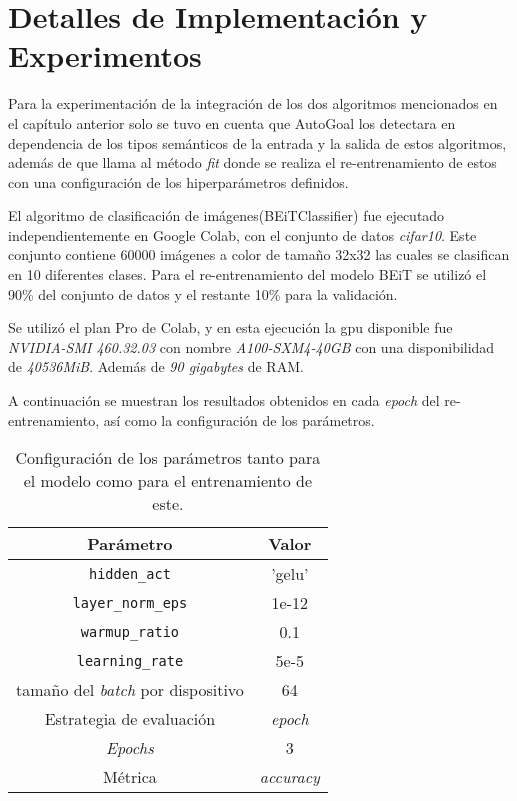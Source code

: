 \chapter{Detalles de Implementación y Experimentos}\label{chapter:implementation}
Para la experimentación de la integración de los dos algoritmos mencionados en el capítulo anterior solo se tuvo en cuenta que AutoGoal los detectara en dependencia de los tipos semánticos de la entrada y la salida de estos algoritmos, además de que llama al método \textit{fit} donde se realiza el re-entrenamiento de estos con una configuración de los hiperparámetros definidos. 

El algoritmo de clasificación de imágenes(BEiTClassifier) fue ejecutado independientemente en Google Colab, con el conjunto de datos \textit{cifar10}. Este conjunto contiene 60000 imágenes a color de tamaño 32x32 las cuales se clasifican en 10 diferentes clases. Para el re-entrenamiento del modelo BEiT se utilizó el 90\% del conjunto de datos y el restante 10\% para la validación.

Se utilizó el plan Pro de Colab, y en esta ejecución la gpu disponible fue \textit{NVIDIA-SMI 460.32.03} con nombre \textit{A100-SXM4-40GB} con una disponibilidad de \textit{40536MiB}. Además de \textit{90 gigabytes} de RAM.

A continuación se muestran los resultados obtenidos en cada \textit{epoch} del re-entrenamiento, así como la configuración de los parámetros. 

\begin{table}[h!]
  \centering
  \begin{tabular}{||c c||} 
      \hline
      Parámetro & Valor \\ [0.5ex] 
      \hline\hline
      \texttt{hidden\_act} & 'gelu' \\ 
      \hline
      \texttt{layer\_norm\_eps} & 1e-12 \\
      \hline
      \texttt{warmup\_ratio} & 0.1 \\
      \hline
      \texttt{learning\_rate} & 5e-5 \\
      \hline
      tamaño del \textit{batch} por dispositivo & 64 \\
      \hline
      Estrategia de evaluación & \textit{epoch} \\
      \hline
      \textit{Epochs} & 3 \\
      \hline
      Métrica & \textit{accuracy} \\ [1ex] 
      \hline
  \end{tabular}
  \caption{Configuración de los parámetros tanto para el modelo como para el entrenamiento de este.}
  \label{table:1}
\end{table}

